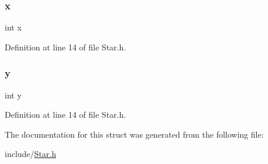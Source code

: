 \subsubsection{\texorpdfstring{x}{x}}
{\footnotesize\ttfamily int x}



Definition at line 14 of file Star.\+h.

\mbox{\label{structstars_a0a2f84ed7838f07779ae24c5a9086d33}} 
\subsubsection{\texorpdfstring{y}{y}}
{\footnotesize\ttfamily int y}



Definition at line 14 of file Star.\+h.



The documentation for this struct was generated from the following file\+:\begin{DoxyCompactItemize}
\item 
include/\hyperlink{_star_8h}{Star.\+h}\end{DoxyCompactItemize}
